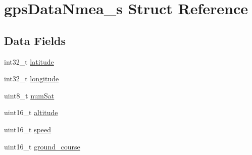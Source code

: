 \hypertarget{structgpsDataNmea__s}{\section{gps\+Data\+Nmea\+\_\+s Struct Reference}
\label{structgpsDataNmea__s}
}
\subsection*{Data Fields}
\begin{DoxyCompactItemize}
\item 
int32\+\_\+t \hyperlink{structgpsDataNmea__s_ac2596fd3d15e2d164a0282f4185e7b85}{latitude}
\item 
int32\+\_\+t \hyperlink{structgpsDataNmea__s_a5882f2a75b00995fd5653402b8c0584a}{longitude}
\item 
uint8\+\_\+t \hyperlink{structgpsDataNmea__s_a9ac8b69516d7ddbf1e3679552e6d54cc}{num\+Sat}
\item 
uint16\+\_\+t \hyperlink{structgpsDataNmea__s_aeb366fa2b20d3df0817a5f84a9ed9a91}{altitude}
\item 
uint16\+\_\+t \hyperlink{structgpsDataNmea__s_ac3db9cac6a859cae7a8523edbe19eada}{speed}
\item 
uint16\+\_\+t \hyperlink{structgpsDataNmea__s_a3f85ec0e7e8d6b71427236b2c33d2931}{ground\+\_\+course}
\end{DoxyCompactItemize}


